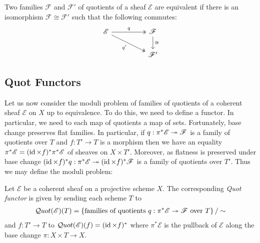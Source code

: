 \documentclass[12pt]{ociamthesis}  %
\begin{document}
Two families $\mathscr F$ and $\mathscr F'$ of quotients of a
sheaf $\mathscr E$ are equivalent if there is an isomorphism
$\mathscr F\cong\mathscr F'$ such that the following commutes:
\begin{equation}\label{eq:quotient_equivalence}
  \begin{tikzcd}
    {\mathscr E} && {\mathscr F} \\
    && {\mathscr F'}
    \arrow["q", two heads, from=1-1, to=1-3]
    \arrow["{q'}"', two heads, from=1-1, to=2-3]
    \arrow["\cong", from=1-3, to=2-3]
  \end{tikzcd}
\end{equation}

\subsection{Quot Functors}

Let us now consider the moduli problem of families of
quotients of a coherent sheaf $\mathscr E$ on $X$ up to equivalence.
To do this, we need to define a functor. In particular, we need to
each map of quotients a map of sets. Fortunately, base change preserves flat families.
In particular,
if $q : \pi^*\mathscr E \twoheadrightarrow \mathscr F$ is a family of quotients over $T$ and
$f : T' \to T$ is a morphism then we have an equality
$\pi^*\mathscr E = (\operatorname{id}\times f)^*\pi^*\mathscr E$
of sheaves on $X\times T'$.
Moreover, as flatness is preserved under base change \cite[\href{https://stacks.math.columbia.edu/tag/01U9}{Tag 01U9}]{stacks-project}
$(\operatorname{id}\times f)^*q : \pi^*\mathscr E \twoheadrightarrow (\operatorname{id}\times f)^*\mathscr F$
is a family of quotients over $T'$. Thus we may define the moduli problem:

\begin{definition}
  Let $\mathscr E$ be a coherent sheaf on a projective scheme $X$.
  The corresponding \emph{Quot functor} is given by sending each
  scheme $T$ to
  \begin{align*}
    \mathcal Quot (\mathscr E)(T) = \left\lbrace{
      \text{families of quotients $q : \pi^*\mathscr E \twoheadrightarrow \mathscr F$
        over $T$}
    }\right\rbrace / \sim
  \end{align*}
  and $f : T' \to T$ to
  $\mathcal Quot(\mathscr E)(f) = (\operatorname{id} \times f)^*$ where
  $\pi^*\mathscr E$ is the pullback of $\mathscr E$ along
  the base change $\pi:X\times T\to X$.
\end{definition}
\end{document}
